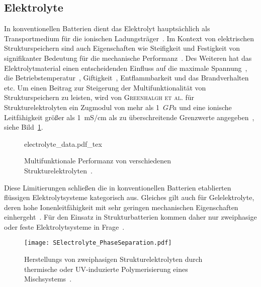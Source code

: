 \subsection{Elektrolyte}
In konventionellen Batterien dient das Elektrolyt hauptsächlich als Transportmedium für die ionischen Ladungsträger~\cite{Gerlach2020}. Im Kontext von elektrischen Strukturspeichern sind auch Eigenschaften wie Steifigkeit und Festigkeit von signifikanter Bedeutung für die mechanische Performanz~\cite{Greenhalgh2023}. Des Weiteren hat das Elektrolytmaterial einen entscheidenden Einfluss auf die maximale Spannung~\cite{Xu2016}, die Betriebstemperatur~\cite{Chen2022a}, Giftigkeit~\cite{Beard2019}, Entflammbarkeit und das Brandverhalten~\cite{Roth2012} etc. Um einen Beitrag zur Steigerung der Multifunktionalität von Strukturspeichern zu leisten, wird von \textsc{Greenhalgh et al.} für Strukturelektrolyten ein Zugmodul von mehr als 1~$\si{GPa}$ und eine ionische Leitfähigkeit größer als 1~$\si{\milli \siemens \per \cm}$ als zu überschreitende Grenzwerte angegeben~\cite{Greenhalgh2023}, siehe Bild~\ref{fig:electrolyte_data}.
\begin{figure}[ht]
        \center
		{electrolyte_data.pdf_tex}
		\caption{\label{fig:electrolyte_data}Multifunktionale Performanz von verschiedenen Strukturelektrolyten~\cite{Greenhalgh2023}.}
\end{figure}
Diese Limitierungen schließen die in konventionellen Batterien etablierten flüssigen Elektrolytsysteme kategorisch aus. Gleiches gilt auch für Gelelektrolyte, deren hohe Ionenleitfähigkeit mit sehr geringen mechanischen Eigenschaften einhergeht~\cite{Gayet2009, Li2018, Zhao2020a}. Für den Einsatz in Strukturbatterien kommen daher nur zweiphasige oder feste Elektrolytsysteme in Frage~\cite{Greenhalgh2023}.

\begin{figure}[!h]
        \center
		\texttt{[image: SElectrolyte\_PhaseSeparation.pdf]}
		\caption{\label{fig:SE_PhaseSepearation}Herstellungs von zweiphasigen Strukturelektrolyten durch thermische oder UV-induzierte Polymerisierung eines Mischsystems~\cite{Schneider2019}.}
\end{figure}


